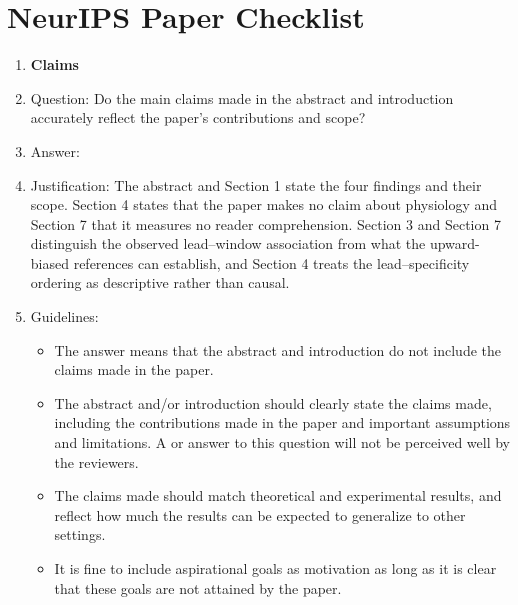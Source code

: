 \section*{NeurIPS Paper Checklist}



\begin{enumerate}

\item {\bf Claims}
    \item[] Question: Do the main claims made in the abstract and introduction accurately reflect the paper's contributions and scope?
    \item[] Answer: \answerYes{}
    \item[] Justification: The abstract and Section 1 state the four findings and their scope. Section 4 states that the paper makes no claim about physiology and Section 7 that it measures no reader comprehension. Section 3 and Section 7 distinguish the observed lead--window association from what the upward-biased references can establish, and Section 4 treats the lead--specificity ordering as descriptive rather than causal.
    \item[] Guidelines:
    \begin{itemize}
        \item The answer \answerNA{} means that the abstract and introduction do not include the claims made in the paper.
        \item The abstract and/or introduction should clearly state the claims made, including the contributions made in the paper and important assumptions and limitations. A \answerNo{} or \answerNA{} answer to this question will not be perceived well by the reviewers. 
        \item The claims made should match theoretical and experimental results, and reflect how much the results can be expected to generalize to other settings. 
        \item It is fine to include aspirational goals as motivation as long as it is clear that these goals are not attained by the paper. 
    \end{itemize}


\end{enumerate}
